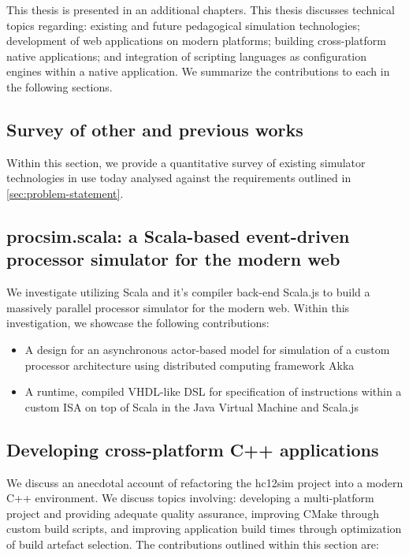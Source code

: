 
This thesis is presented in an additional  chapters. This thesis discusses technical topics regarding: existing and future pedagogical simulation technologies; development of web applications on modern platforms; building cross-platform native applications; and integration of scripting languages as configuration engines within a native application. We summarize the contributions to each in the following sections.

\subsection{Survey of other and previous works}

Within this section, we provide a quantitative survey of existing simulator technologies in use today analysed against the requirements outlined in \cref{sec:problem-statement}.

\subsection{procsim.scala: a Scala-based event-driven processor simulator for the modern web}

We investigate utilizing Scala and it's compiler back-end Scala.js to build a massively parallel processor simulator for the modern web. Within this investigation, we showcase the following contributions: 

\begin{itemize}
    \item A design for an asynchronous actor-based model for simulation of a custom processor architecture using distributed computing framework Akka
    \item A runtime, compiled VHDL-like DSL for specification of instructions within a custom ISA on top of Scala in the Java Virtual Machine and Scala.js
\end{itemize}

\subsection{Developing cross-platform C++ applications}

We discuss an anecdotal account of refactoring the hc12sim project into a modern C++ environment. We discuss topics involving: developing a multi-platform project and providing adequate quality assurance, improving CMake through custom build scripts, and improving application build times through optimization of build artefact selection. The contributions outlined within this section are: 

